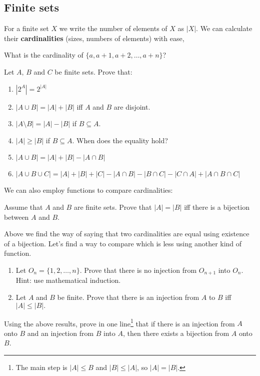 \subsection{Finite sets}
For a finite set $X$ we write the number of elements of $X$ as $|X|$. We can calculate their \textbf{cardinalities} (sizes, numbers of elements) with
ease,
\begin{prob}
	What is the cardinality of $\{a, a+1, a+2, \dots, a+n\}$?
\end{prob}
\begin{prob}
	Let $A,\,B$ and $C$ be finite sets. Prove that:
	\begin{enumerate}
		\item $|2^A|=2^{|A|}$
		\item $|A\cup B|=|A|+|B|$ iff $A$ and $B$ are disjoint.
		\item $|A\setminus B|=|A|-|B|$ if $B\subseteq A.$
		\item $|A| \ge |B|$ if $B\subseteq A$. When does the equality hold?
		\item $|A\cup B| = |A| + |B| - |A\cap B|$
		\item $|A\cup B\cup C| = |A|+|B|+|C| - |A\cap B| - |B\cap C|-|C\cap A| + |A\cap B\cap C|$
	\end{enumerate}
\end{prob}
We can also employ functions to compare cardinalities:
\begin{prob}
	Assume that $A$ and $B$ are finite sets. Prove that $|A|=|B|$ iff there is a bijection between $A$ and $B$.
\end{prob}
\begin{prob}
	Above we find the way of saying that two cardinalities are equal using existence of a bijection. Let's find a way to compare which is less using
	another kind of function.
	\begin{enumerate}
		\item Let $O_n=\{1,2,\dots,n\}.$ Prove that there is no injection from $O_{n+1}$ into $O_n$. Hint: use mathematical induction.
		\item Let $A$ and $B$ be finite. Prove that there is an injection from $A$ to $B$ iff $|A| \le |B|.$
	\end{enumerate}
\end{prob}
\begin{prob}
	Using the above results, prove in one line\footnote{The main step is $|A|\le B$ and $|B|\le |A|$, so $|A|=|B|.$} that if there is an injection from $A$ onto $B$ and an injection from $B$ into $A$, then there exists
	a bijection from $A$ onto $B$.
\end{prob}

